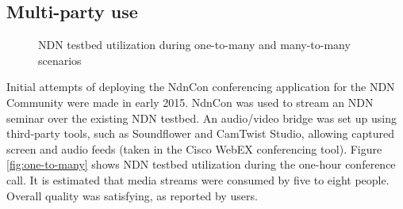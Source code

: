 \documentclass{icn/sig-alternate-2012} %
\begin{document}





\subsection{Multi-party use}

\begin{figure}[t!]
\centering


\caption{NDN testbed utilization during one-to-many and many-to-many scenarios}
\label{fig:testbed-utilization}
\end{figure}

Initial attempts of deploying the NdnCon conferencing application for the NDN Community were made in early 2015. NdnCon was used to stream an NDN seminar over the existing NDN testbed. An audio/video bridge was set up using third-party tools, such as Soundflower and CamTwist Studio, allowing captured screen and audio feeds (taken in the Cisco WebEX conferencing tool). Figure \ref{fig:one-to-many} shows NDN testbed utilization during the one-hour conference call. It is estimated that media streams were consumed by five to eight people. Overall quality was satisfying, as reported by users.
\end{document}

